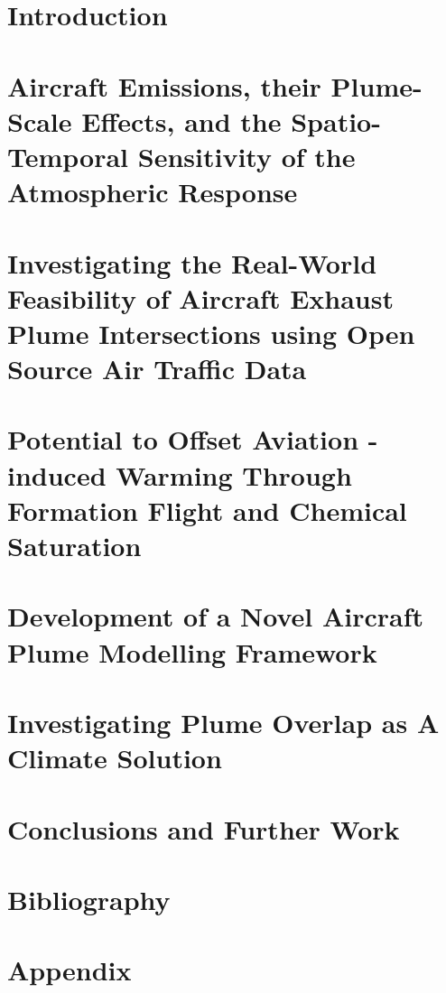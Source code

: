 \documentclass[
  ieee        %
]{uob-thesis}
\begin{document}
\tableofcontents
\listoftables
\listoffigures



\mainmatter

\chapter{Introduction}
\label{chapter1}


\chapter{Aircraft Emissions, their Plume-Scale Effects, and the Spatio-Temporal Sensitivity of the Atmospheric Response}
\label{chapter2}


\chapter{Investigating the Real-World Feasibility of Aircraft Exhaust Plume Intersections using Open Source Air Traffic Data} 
\label{chapter3}


\chapter{Potential to Offset Aviation \texorpdfstring{}{NOx}-induced Warming Through Formation Flight and Chemical Saturation}\label{chapter4}


\chapter{Development of a Novel Aircraft Plume Modelling Framework}
\label{chapter5}


\chapter{Investigating Plume Overlap as A Climate Solution}
\label{chapter6}


\chapter{Conclusions and Further Work}
\label{chapter7}




\backmatter

\chapter*{Bibliography}
\printbibliography[heading=none]

\appendix
\chapter{Appendix}
\label{appendix}

\end{document}
